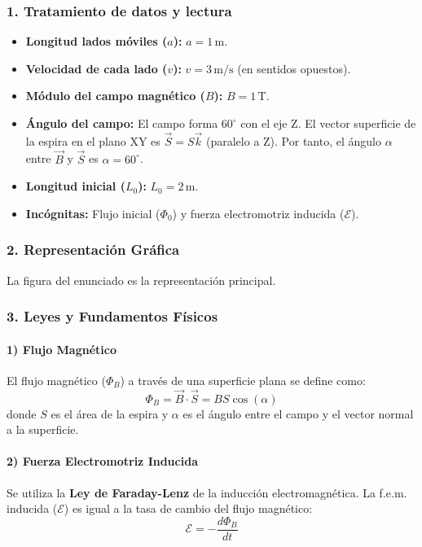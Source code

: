 \subsubsection*{1. Tratamiento de datos y lectura}
\begin{itemize}
    \item \textbf{Longitud lados móviles ($a$):} $a=1\,\text{m}$.
    \item \textbf{Velocidad de cada lado ($v$):} $v=3\,\text{m/s}$ (en sentidos opuestos).
    \item \textbf{Módulo del campo magnético ($B$):} $B=1\,\text{T}$.
    \item \textbf{Ángulo del campo:} El campo forma $60^\circ$ con el eje Z. El vector superficie de la espira en el plano XY es $\vec{S}=S\vec{k}$ (paralelo a Z). Por tanto, el ángulo $\alpha$ entre $\vec{B}$ y $\vec{S}$ es $\alpha=60^\circ$.
    \item \textbf{Longitud inicial ($L_0$):} $L_0=2\,\text{m}$.
    \item \textbf{Incógnitas:} Flujo inicial ($\Phi_0$) y fuerza electromotriz inducida ($\mathcal{E}$).
\end{itemize}

\subsubsection*{2. Representación Gráfica}
La figura del enunciado es la representación principal.

\subsubsection*{3. Leyes y Fundamentos Físicos}
\paragraph{1) Flujo Magnético}
El flujo magnético ($\Phi_B$) a través de una superficie plana se define como:
$$ \Phi_B = \vec{B} \cdot \vec{S} = B S \cos(\alpha) $$
donde $S$ es el área de la espira y $\alpha$ es el ángulo entre el campo y el vector normal a la superficie.
\paragraph{2) Fuerza Electromotriz Inducida}
Se utiliza la \textbf{Ley de Faraday-Lenz} de la inducción electromagnética. La f.e.m. inducida ($\mathcal{E}$) es igual a la tasa de cambio del flujo magnético:
$$ \mathcal{E} = -\frac{d\Phi_B}{dt} $$

